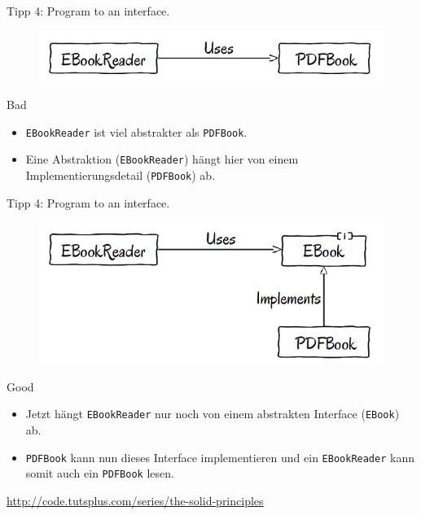 \documentclass[18pt]{beamer}
\begin{document}
\begin{frame}{Tipp 4: Program to an interface.}
    \begin{figure}
        \includegraphics[scale=.4]{img/ebookreader-pdfbook.png}
    \end{figure}
    \begin{alertblock}{Bad}
        \begin{itemize}
            \item \texttt{EBookReader} ist viel abstrakter als \texttt{PDFBook}.
            \item Eine Abstraktion (\texttt{EBookReader}) hängt hier von einem Implementierungsdetail (\texttt{PDFBook}) ab.
        \end{itemize}
    \end{alertblock}
\end{frame}

\begin{frame}{Tipp 4: Program to an interface.}
    \begin{figure}
        \includegraphics[scale=.4]{img/ebookreader-ebookinterface-pdfbook.png}
    \end{figure}
    \begin{exampleblock}{Good}
        \begin{itemize}
            \item Jetzt hängt \texttt{EBookReader} nur noch von einem abstrakten Interface (\texttt{EBook}) ab.
            \item \texttt{PDFBook} kann nun dieses Interface implementieren und ein \texttt{EBookReader} kann somit auch ein \texttt{PDFBook} lesen.
        \end{itemize}
    \end{exampleblock}

    \vspace{.1in}
    \footnotesize
    \url{http://code.tutsplus.com/series/the-solid-principles}
    \vspace{.1in}
\end{frame}
\end{document}
